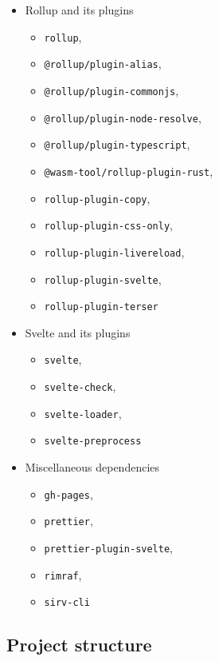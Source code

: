\documentclass[english,bachelors,forcepolishlogotype]{wizthesis}
\begin{document}
\begin{itemize}
  \item Rollup and its plugins
  \begin{itemize}[noitemsep,nolistsep]
    \item \texttt{rollup},
    \item \texttt{@rollup/plugin-alias},
    \item \texttt{@rollup/plugin-commonjs},
    \item \texttt{@rollup/plugin-node-resolve},
    \item \texttt{@rollup/plugin-typescript},
    \item \texttt{@wasm-tool/rollup-plugin-rust},
    \item \texttt{rollup-plugin-copy},
    \item \texttt{rollup-plugin-css-only},
    \item \texttt{rollup-plugin-livereload},
    \item \texttt{rollup-plugin-svelte},
    \item \texttt{rollup-plugin-terser}
  \end{itemize}
  \item Svelte and its plugins
  \begin{itemize}[noitemsep,nolistsep]
    \item \texttt{svelte},
    \item \texttt{svelte-check},
    \item \texttt{svelte-loader},
    \item \texttt{svelte-preprocess}
  \end{itemize}
  \item Miscellaneous dependencies
  \begin{itemize}[noitemsep,nolistsep]
    \item \texttt{gh-pages},
    \item \texttt{prettier},
    \item \texttt{prettier-plugin-svelte},
    \item \texttt{rimraf},
    \item \texttt{sirv-cli}
  \end{itemize}
\end{itemize}

\newpage

\subsection{Project structure} \label{sbs:project-structure}
\end{document}
